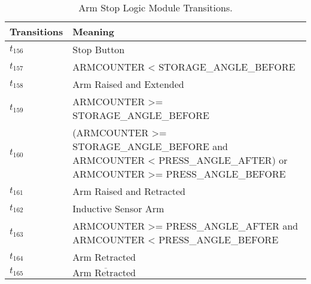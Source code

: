 \begin{table}[H]
\caption{Arm Stop Logic Module Transitions.}
\centering
\begin{tabular}{M{5cm}M{10cm}}
Transitions & Meaning\\
\hline
\hyperlink{partialNet:t156}{\hypertarget{partialTable:t156}{$t_{156}$}} & Stop Button\\
\hyperlink{partialNet:t157}{\hypertarget{partialTable:t157}{$t_{157}$}} & ARMCOUNTER < {\footnotesize STORAGE\_ANGLE\_BEFORE}\\
\hyperlink{partialNet:t158}{\hypertarget{partialTable:t158}{$t_{158}$}} & Arm Raised and Extended\\
\hyperlink{partialNet:t159}{\hypertarget{partialTable:t159}{$t_{159}$}} & ARMCOUNTER >= {\footnotesize STORAGE\_ANGLE\_BEFORE}\\
\hyperlink{partialNet:t160}{\hypertarget{partialTable:t160}{$t_{160}$}} & (ARMCOUNTER >= {\footnotesize STORAGE\_ANGLE\_BEFORE} and ARMCOUNTER < {\footnotesize PRESS\_ANGLE\_AFTER}) or ARMCOUNTER >= {\footnotesize PRESS\_ANGLE\_BEFORE}\\
\hyperlink{partialNet:t161}{\hypertarget{partialTable:t161}{$t_{161}$}} & Arm Raised and Retracted\\
\hyperlink{partialNet:t162}{\hypertarget{partialTable:t162}{$t_{162}$}} & Inductive Sensor Arm\\
\hyperlink{partialNet:t163}{\hypertarget{partialTable:t163}{$t_{163}$}} & ARMCOUNTER >= {\footnotesize PRESS\_ANGLE\_AFTER} and ARMCOUNTER < {\footnotesize PRESS\_ANGLE\_BEFORE}\\
\hyperlink{partialNet:t164}{\hypertarget{partialTable:t164}{$t_{164}$}} & Arm Retracted\\
\hyperlink{partialNet:t165}{\hypertarget{partialTable:t165}{$t_{165}$}} & \(\overline{\mbox{Arm Retracted }}\)\\
\end{tabular}
\end{table}
